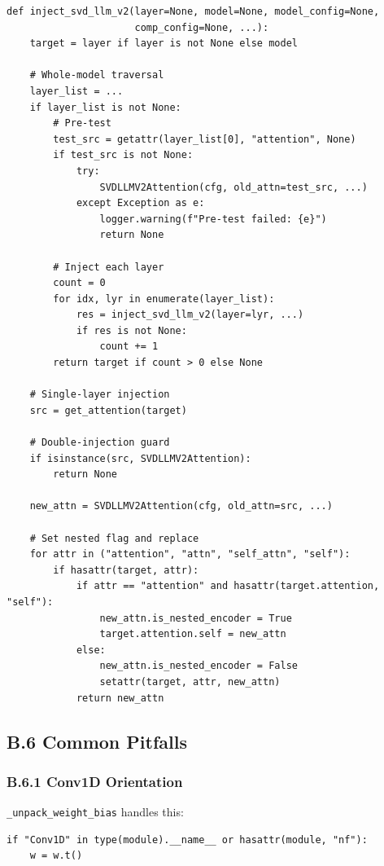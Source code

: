 \begin{lstlisting}
def inject_svd_llm_v2(layer=None, model=None, model_config=None,
                      comp_config=None, ...):
    target = layer if layer is not None else model
    
    # Whole-model traversal
    layer_list = ...
    if layer_list is not None:
        # Pre-test
        test_src = getattr(layer_list[0], "attention", None)
        if test_src is not None:
            try:
                SVDLLMV2Attention(cfg, old_attn=test_src, ...)
            except Exception as e:
                logger.warning(f"Pre-test failed: {e}")
                return None
        
        # Inject each layer
        count = 0
        for idx, lyr in enumerate(layer_list):
            res = inject_svd_llm_v2(layer=lyr, ...)
            if res is not None:
                count += 1
        return target if count > 0 else None
    
    # Single-layer injection
    src = get_attention(target)
    
    # Double-injection guard
    if isinstance(src, SVDLLMV2Attention):
        return None
    
    new_attn = SVDLLMV2Attention(cfg, old_attn=src, ...)
    
    # Set nested flag and replace
    for attr in ("attention", "attn", "self_attn", "self"):
        if hasattr(target, attr):
            if attr == "attention" and hasattr(target.attention, "self"):
                new_attn.is_nested_encoder = True
                target.attention.self = new_attn
            else:
                new_attn.is_nested_encoder = False
                setattr(target, attr, new_attn)
            return new_attn
\end{lstlisting}

\subsection{B.6 Common Pitfalls}

\subsubsection{B.6.1 Conv1D Orientation}

\texttt{\_unpack\_weight\_bias} handles this:

\begin{lstlisting}
if "Conv1D" in type(module).__name__ or hasattr(module, "nf"):
    w = w.t()
\end{lstlisting}

